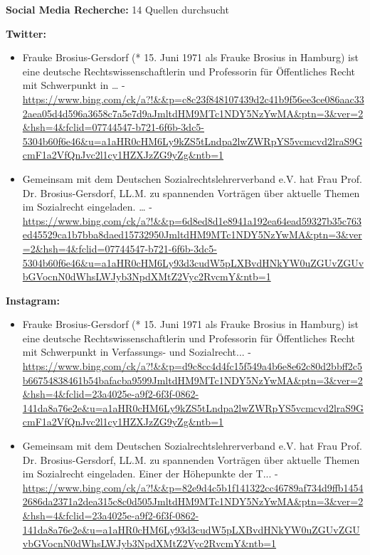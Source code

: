 \documentclass[12pt,a4paper]{article}
\begin{document}
\textbf{Social Media Recherche:} 14 Quellen durchsucht

\textbf{Twitter:}
\begin{itemize}
\item Frauke Brosius-Gersdorf (* 15. Juni 1971 als Frauke Brosius in Hamburg) ist eine deutsche Rechtswissenschaftlerin und Professorin für Öffentliches Recht mit Schwerpunkt in … - \url{https://www.bing.com/ck/a?!&&p=c8c23f848107439d2c41b9f56ee3ce086aac332aea05d4d596a3658c7a5e7d9aJmltdHM9MTc1NDY5NzYwMA&ptn=3&ver=2&hsh=4&fclid=07744547-b721-6f6b-3dc5-5304b60f6e46&u=a1aHR0cHM6Ly9kZS5tLndpa2lwZWRpYS5vcmcvd2lraS9GcmF1a2VfQnJvc2l1cy1HZXJzZG9yZg&ntb=1}
\item Gemeinsam mit dem Deutschen Sozialrechtslehrerverband e.V. hat Frau Prof. Dr. Brosius-Gersdorf, LL.M. zu spannenden Vorträgen über aktuelle Themen im Sozialrecht eingeladen. … - \url{https://www.bing.com/ck/a?!&&p=6d8ed8d1e8941a192ea64ead59327b35c763ed45529ca1b7bba8daed15732950JmltdHM9MTc1NDY5NzYwMA&ptn=3&ver=2&hsh=4&fclid=07744547-b721-6f6b-3dc5-5304b60f6e46&u=a1aHR0cHM6Ly93d3cudW5pLXBvdHNkYW0uZGUvZGUvbGVocnN0dWhsLWJyb3NpdXMtZ2Vyc2RvcmY&ntb=1}
\end{itemize}

\textbf{Instagram:}
\begin{itemize}
\item Frauke Brosius-Gersdorf (* 15. Juni 1971 als Frauke Brosius in Hamburg) ist eine deutsche Rechtswissenschaftlerin und Professorin für Öffentliches Recht mit Schwerpunkt in Verfassungs- und Sozialrecht... - \url{https://www.bing.com/ck/a?!&&p=d9c8cc4d4fc15f549a4b6e8e62c80d2bbff2c5b66754838461b54bafacba9599JmltdHM9MTc1NDY5NzYwMA&ptn=3&ver=2&hsh=4&fclid=23a4025e-a9f2-6f3f-0862-141da8a76e2e&u=a1aHR0cHM6Ly9kZS5tLndpa2lwZWRpYS5vcmcvd2lraS9GcmF1a2VfQnJvc2l1cy1HZXJzZG9yZg&ntb=1}
\item Gemeinsam mit dem Deutschen Sozialrechtslehrerverband e.V. hat Frau Prof. Dr. Brosius-Gersdorf, LL.M. zu spannenden Vorträgen über aktuelle Themen im Sozialrecht eingeladen. Einer der Höhepunkte der T... - \url{https://www.bing.com/ck/a?!&&p=82e9d4c5b1f141322cc46789af734d9ffb14542686da2371a2dea315c8c0d505JmltdHM9MTc1NDY5NzYwMA&ptn=3&ver=2&hsh=4&fclid=23a4025e-a9f2-6f3f-0862-141da8a76e2e&u=a1aHR0cHM6Ly93d3cudW5pLXBvdHNkYW0uZGUvZGUvbGVocnN0dWhsLWJyb3NpdXMtZ2Vyc2RvcmY&ntb=1}
\end{itemize}
\end{document}

